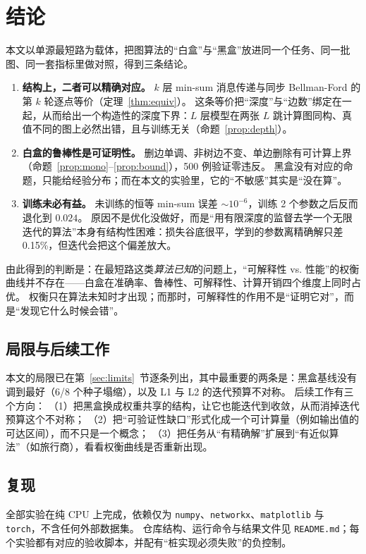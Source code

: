 \section{结论}\label{sec:conclusion}

本文以单源最短路为载体，把图算法的“白盒”与“黑盒”放进同一个任务、同一批图、同一套指标里做对照，得到三条结论。

\begin{enumerate}[leftmargin=1.8em]
\item \textbf{结构上，二者可以精确对应。} $k$ 层 min-sum 消息传递与同步 Bellman-Ford 的第 $k$ 轮逐点等价（定理~\ref{thm:equiv}）。
这条等价把“深度”与“边数”绑定在一起，从而给出一个构造性的深度下界：$L$ 层模型在两张 $L$ 跳计算图同构、真值不同的图上必然出错，且与训练无关（命题~\ref{prop:depth}）。
\item \textbf{白盒的鲁棒性是可证明性。} 删边单调、非树边不变、单边删除有可计算上界（命题~\ref{prop:mono}--\ref{prop:bound}），500 例验证零违反。
黑盒没有对应的命题，只能给经验分布；而在本文的实验里，它的“不敏感”其实是“没在算”。
\item \textbf{训练未必有益。} 未训练的恒等 min-sum 误差 $\sim10^{-6}$，训练 2 个参数之后反而退化到 $0.024$。
原因不是优化没做好，而是“用有限深度的监督去学一个无限迭代的算法”本身有结构性困难：损失谷底很平，学到的参数离精确解只差 0.15\%，但迭代会把这个偏差放大。
\end{enumerate}

由此得到的判断是：在最短路这类\emph{算法已知}的问题上，“可解释性 vs. 性能”的权衡曲线并不存在——白盒在准确率、鲁棒性、可解释性、计算开销四个维度上同时占优。
权衡只在算法未知时才出现；而那时，可解释性的作用不是“证明它对”，而是“发现它什么时候会错”。

\subsection*{局限与后续工作}

本文的局限已在第~\ref{sec:limits}~节逐条列出，其中最重要的两条是：黑盒基线没有调到最好（6/8 个种子塌缩），以及 L1 与 L2 的迭代预算不对称。
后续工作有三个方向：
（1）把黑盒换成权重共享的结构，让它也能迭代到收敛，从而消掉迭代预算这个不对称；
（2）把“可验证性缺口”形式化成一个可计算量（例如输出值的可达区间），而不只是一个概念；
（3）把任务从“有精确解”扩展到“有近似算法”（如旅行商），看看权衡曲线是否重新出现。

\subsection*{复现}

全部实验在纯 CPU 上完成，依赖仅为 \texttt{numpy}、\texttt{networkx}、\texttt{matplotlib} 与 \texttt{torch}，不含任何外部数据集。
仓库结构、运行命令与结果文件见 \texttt{README.md}；每个实验都有对应的验收脚本，并配有“桩实现必须失败”的负控制。
